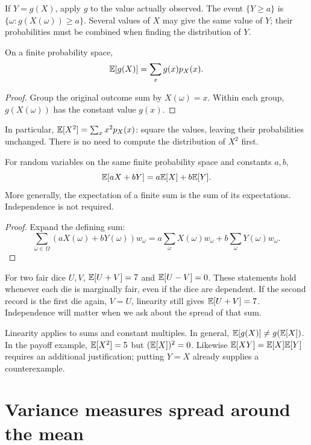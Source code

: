 If $Y=g(X)$, apply $g$ to the value actually observed. The event
$\{Y\ge a\}$ is $\{\omega:g(X(\omega))\ge a\}$.
Several values of $X$ may give the same value of $Y$; their probabilities
must be combined when finding the distribution of $Y$.

\begin{theorem}
On a finite probability space,
\[
 \mathbb E[g(X)]=\sum_x g(x)p_X(x).
\]
\end{theorem}
\begin{proof}
Group the original outcome sum by $X(\omega)=x$. Within each group,
$g(X(\omega))$ has the constant value $g(x)$.
\end{proof}
In particular, $\mathbb E[X^2]=\sum_x x^2p_X(x)$: square the values, leaving
their probabilities unchanged. There is no need to compute the
distribution of $X^2$ first.

\begin{theorem}[Linearity]
For random variables on the same finite probability space and constants $a,b$,
\[
 \mathbb E[aX+bY]=a\mathbb E[X]+b\mathbb E[Y].
\]
More generally, the expectation of a finite sum is the sum of its expectations.
Independence is not required.
\end{theorem}
\begin{proof}
Expand the defining sum:
\[
 \sum_{\omega\in\Omega}
 (aX(\omega)+bY(\omega))w_\omega
 =a\sum_\omega X(\omega)w_\omega+
 b\sum_\omega Y(\omega)w_\omega.
\]
\end{proof}

\begin{example}
For two fair dice $U,V$, $\mathbb E[U+V]=7$ and $\mathbb E[U-V]=0$.
These statements hold whenever each die is marginally fair, even if the
dice are dependent. If the second record is the first die again,
$V=U$, linearity still gives $\mathbb E[U+V]=7$.
Independence will matter when we ask about the spread of that sum.
\end{example}

\begin{warningbox}
Linearity applies to sums and constant multiples. In general,
$\mathbb E[g(X)]\ne g(\mathbb E[X])$. In the payoff example,
$\mathbb E[X^2]=5$ but $(\mathbb E[X])^2=0$.
Likewise $\mathbb E[XY]=\mathbb E[X]\mathbb E[Y]$ requires an additional justification;
putting $Y=X$ already supplies a counterexample.
\end{warningbox}

\section{Variance measures spread around the mean}
\label{sec:discrete-variance}

